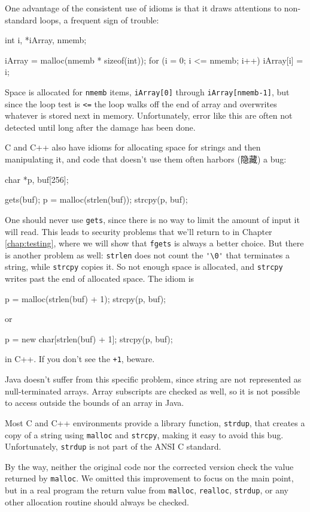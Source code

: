 One advantage of the consistent use of idioms is that it draws attentions
to non-standard loops, a frequent sign of trouble:
\begin{wellcode}
    int i, *iArray, nmemb;

    iArray = malloc(nmemb * sizeof(int));
    for (i = 0; i <= nmemb; i++)
        iArray[i] = i;
\end{wellcode}
Space is allocated for \verb'nmemb' items, \verb'iArray[0]' through
\verb'iArray[nmemb-1]', but since the loop test is \verb'<=' the loop walks
off the end of array and overwrites whatever is stored next in memory.
Unfortunately, error like this are often not detected until long after the
damage has been done.

C and C++ also have idioms for allocating space for strings and then
manipulating it, and code that doesn't use them often harbors (隐藏) a bug:
\begin{badcode}
    char *p, buf[256];

    gets(buf);
    p = malloc(strlen(buf));
    strcpy(p, buf);
\end{badcode}
One should never use \verb'gets', since there is no way to limit the amount
of input it will read. This leads to security problems that we'll return to
in Chapter \ref{chap:testing}, where we will show that \verb'fgets' is
always a better choice. But there is another problem as well:
\verb'strlen' does not count the \verb"'\0'" that terminates a string,
while \verb'strcpy' copies it. So not enough space is allocated, and
\verb'strcpy' writes past the end of allocated space. The idiom is 
\begin{wellcode}
    p = malloc(strlen(buf) + 1);
    strcpy(p, buf);
\end{wellcode}
or 
\begin{wellcode}
    p = new char[strlen(buf) + 1];
    strcpy(p, buf);
\end{wellcode}
in C++. If you don't see the \verb'+1', beware.

Java doesn't suffer from this specific problem, since string are not
represented as null-terminated arrays. Array subscripts are checked as
well, so it is not possible to access outside the bounds of an array in Java.

Most C and C++ environments provide a library function, \verb'strdup', that
creates a copy of a string using \verb'malloc' and \verb'strcpy', making it
easy to avoid this bug. Unfortunately, \verb'strdup' is not part of the
ANSI C standard.

By the way, neither the original code nor the corrected version check the
value returned by \verb'malloc'. We omitted this improvement to focus on
the main point, but in a real program the return value from \verb'malloc',
\verb'realloc', \verb'strdup', or any other allocation routine should
always be checked.

